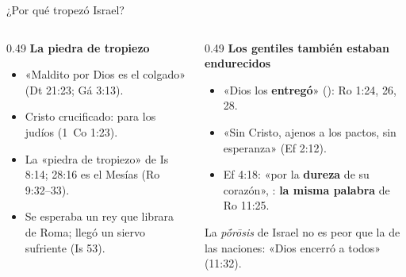 \begin{frame}{¿Por qué tropezó Israel?}
\begin{columns}[T,onlytextwidth]
\begin{column}{0.49\textwidth}\scriptsize\RaggedRight
\textbf{\textcolor{cafe}{La piedra de tropiezo}}
\begin{itemize}
\item «Maldito por Dios es el colgado» (Dt 21:23; Gá 3:13).
\item Cristo crucificado:  para los judíos (1~Co 1:23).
\item La «piedra de tropiezo» de Is 8:14; 28:16 es el Mesías (Ro 9:32--33).
\item Se esperaba un rey que librara de Roma; llegó un siervo sufriente (Is 53).
\end{itemize}
\end{column}
\begin{column}{0.49\textwidth}\scriptsize\RaggedRight
\textbf{\textcolor{cafe}{Los gentiles también estaban endurecidos}}
\begin{itemize}
\item «Dios los \textbf{entregó}» (): Ro 1:24, 26, 28.
\item «Sin Cristo, ajenos a los pactos, sin esperanza» (Ef 2:12).
\item Ef 4:18: «por la \textbf{dureza} de su corazón», : \textbf{la misma palabra} de Ro 11:25.
\end{itemize}
\begin{tcolorbox}[colback=piedra,colframe=ladrillo,boxrule=0.8pt,arc=2pt,fontupper=\scriptsize]
La \emph{pṓrōsis} de Israel no es peor que la de las naciones: «Dios encerró a todos» (11:32).
\end{tcolorbox}
\end{column}
\end{columns}
\end{frame}

